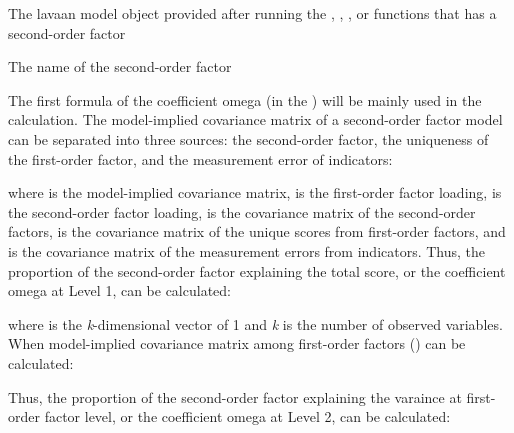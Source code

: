 \documentclass[a4paper]{book}
\begin{document}
%
\begin{Arguments}
\begin{ldescription}
\item[\code{object}] The lavaan model object provided after running the , , , or  functions that has a second-order factor
\item[\code{secondFactor}] The name of the second-order factor
\end{ldescription}
\end{Arguments}
%
\begin{Details}\relax
The first formula of the coefficient omega (in the ) will be mainly used in the calculation. The model-implied covariance matrix of a second-order factor model can be separated into three sources: the second-order factor, the uniqueness of the first-order factor, and the measurement error of indicators: 


where \eqn{\hat{\Sigma}}{} is the model-implied covariance matrix, \eqn{\Lambda}{} is the first-order factor loading,  is the second-order factor loading,  is the covariance matrix of the second-order factors,  is the covariance matrix of the unique scores from first-order factors, and \eqn{\Theta}{} is the covariance matrix of the measurement errors from indicators. Thus, the proportion of the second-order factor explaining the total score, or the coefficient omega at Level 1, can be calculated:


where  is the \emph{k}-dimensional vector of 1 and \emph{k} is the number of observed variables. When model-implied covariance matrix among first-order factors () can be calculated:


Thus, the proportion of the second-order factor explaining the varaince at first-order factor level, or the coefficient omega at Level 2, can be calculated:


\end{Details}
\end{document}
